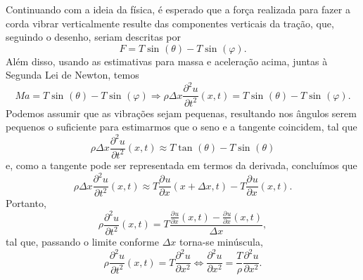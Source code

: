 \documentclass[../pde_notes.tex]{subfiles}
\begin{document}
Continuando com a ideia da física, é esperado que a força realizada para fazer a corda vibrar verticalmente resulte das componentes verticais da tração, que, seguindo o desenho, seriam descritas por
\[
	F = T\sin^{}{(\theta )} - T \sin^{}{(\varphi )}.
\]
Além disso, usando as estimativas para massa e aceleração acima, juntas à Segunda Lei de Newton, temos
\[
	Ma = T\sin^{}{(\theta )} - T \sin^{}{(\varphi )} \Rightarrow \rho \Delta x \frac{\partial^{2}u}{\partial t^{2}}(x, t) = T\sin^{}{(\theta )} - T \sin^{}{(\varphi )}.
\]
Podemos assumir que as vibrações sejam pequenas, resultando nos ângulos serem pequenos o suficiente para estimarmos que o seno e a tangente coincidem, tal que
\[
	\rho \Delta x \frac{\partial^{2}u}{\partial t^{2}}(x, t) \approx T \tan^{}{(\theta )} - T \sin^{}{(\theta )}
\]
e, como a tangente pode ser representada em termos da derivada, concluímos que
\[
	\rho \Delta x \frac{\partial^{2}u}{\partial t^{2}}(x, t) \approx T \frac{\partial^{}u}{\partial x^{}}(x+\Delta x, t) - T \frac{\partial^{}u}{\partial x^{}}(x, t).
\]
Portanto,
\[
	\rho \frac{\partial^{2}u}{\partial t^{2}}(x, t) = T \frac{\frac{\partial^{}u}{\partial x^{}}(x, t)-\frac{\partial^{}u}{\partial x^{}}(x, t)}{\Delta x},
\]
tal que, passando o limite conforme \(\Delta x\) torna-se minúscula,
\[
	\rho\frac{\partial^{2}u}{\partial t^{2}}(x, t) = T \frac{\partial^{2}u}{\partial x^{2}} \Longleftrightarrow \frac{\partial^{2}u}{\partial x^{2}}= \frac{T}{\rho }\frac{\partial^{2}u}{\partial x^{2}}.
\]
\end{document}
